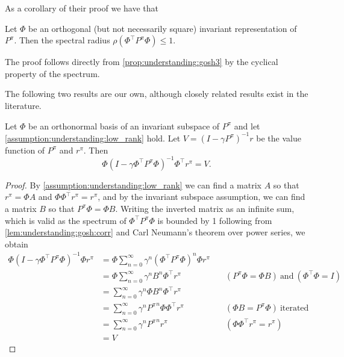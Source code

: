As a corollary of their proof we have that 

\begin{lemma}\label{lem:understanding:gosh:corr}
    Let $\Phi$ be an orthogonal (but not necessarily square) invariant representation of $P^\pi$. Then the spectral radius $\rho(\Phi^\top P^\pi \Phi) \leq 1.$ 
\end{lemma}

The proof follows directly from \autoref{prop:understanding:gosh3} by the cyclical property of the spectrum.
    

The following two results are our own, although closely related results exist in the literature.

\begin{lemma}\label{lem:understanding:lossless_approx}
    Let $\Phi$ be an orthonormal basis of an invariant subspace of $P^\pi$ and let \autoref{assumption:understanding:low_rank} hold. Let $V = (I - \gamma P^\pi)^{-1} r$ be the value function of $P^\pi$ and $r^\pi$. Then $$\Phi (I - \gamma \Phi^\top P^\pi \Phi)^{-1} \Phi^\top r^\pi = V.$$
\end{lemma}
\begin{proof}
    By \autoref{assumption:understanding:low_rank} we can find a matrix $A$ so that $r^\pi = \Phi A$ and $\Phi\Phi^\top r^\pi = r^\pi$, and by the invariant subspace assumption, we can find a matrix $B$ so that $P^\pi \Phi = \Phi B$.
    Writing the inverted matrix as an infinite sum, which is valid as the spectrum of $\Phi^\top P^\pi \Phi$ is bounded by 1 following from \autoref{lem:understanding:gosh:corr} and Carl Neumann's theorem over power series, we obtain
    \begin{align*}
        \Phi (I - \gamma \Phi^\top P^\pi \Phi)^{-1} \Phi r^\pi &= \Phi \sum_{n=0}^\infty \gamma^n (\Phi^\top P^\pi \Phi)^n \Phi r^\pi \\
        &= \Phi \sum_{n=0}^\infty \gamma^n B^n \Phi^\top r^\pi &\quad (P^\pi \Phi = \Phi B)~\text{and}~(\Phi^\top \Phi = I)\\
        &= \sum_{n=0}^\infty \gamma^n \Phi B^n \Phi^\top r^\pi \\
        &= \sum_{n=0}^\infty \gamma^n {P^\pi}^n \Phi\Phi^\top r^\pi &\quad (\Phi B = P^\pi \Phi)~\text{iterated} \\
        &= \sum_{n=0}^\infty \gamma^n {P^\pi}^n r^\pi &\quad (\Phi\Phi^\top r^\pi = r^\pi) \\
        &= V
    \end{align*}
\end{proof}



